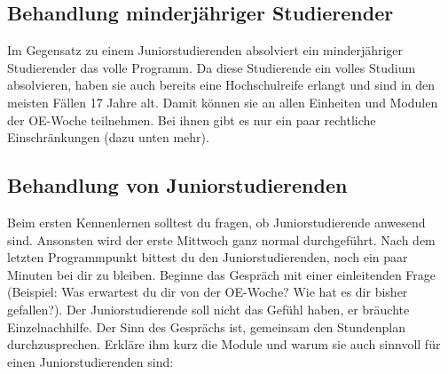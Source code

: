 \documentclass[a4paper,11pt]{scrartcl} %
\begin{document}
	\subsection{Behandlung minderjähriger Studierender}

Im Gegensatz zu einem Juniorstudierenden absolviert ein minderjähriger Studierender das volle Programm. Da diese Studierende ein volles Studium absolvieren, haben sie auch bereits eine Hochschulreife erlangt und sind in den meisten Fällen 17 Jahre alt. Damit können sie an allen Einheiten und Modulen der OE-Woche teilnehmen. Bei ihnen gibt es nur ein paar rechtliche Einschränkungen (dazu unten mehr).

	\subsection{Behandlung von Juniorstudierenden}

Beim ersten Kennenlernen solltest du fragen, ob Juniorstudierende anwesend sind. Ansonsten wird der erste Mittwoch ganz normal durchgeführt. Nach dem letzten Programmpunkt bittest du den Juniorstudierenden, noch ein paar Minuten bei dir zu bleiben. Beginne das Gespräch mit einer einleitenden Frage (Beispiel: Was erwartest du dir von der OE-Woche? Wie hat es dir bisher gefallen?). Der Juniorstudierende soll nicht das Gefühl haben, er bräuchte Einzelnachhilfe. Der Sinn des Gesprächs ist, gemeinsam den Stundenplan durchzusprechen. Erkläre ihm kurz die Module und warum sie auch sinnvoll für einen Juniorstudierenden sind:

\newpage
\end{document}
